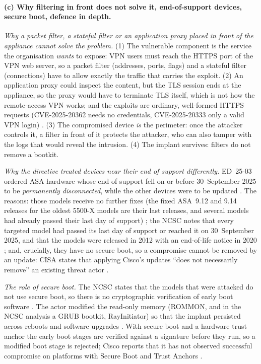 \documentclass[11pt,a4paper]{article}
\begin{document}
\paragraph{(c) Why filtering in front does not solve it, end-of-support devices, secure boot, defence in depth.}
\emph{Why a packet filter, a stateful filter or an application proxy placed in front of the appliance cannot solve the problem.}
(1) The vulnerable component is the service the organisation \emph{wants} to expose: VPN users must reach the HTTPS port of the VPN web server, so a packet filter
(addresses, ports, flags) and a stateful filter (connections) have to allow exactly the traffic that carries the exploit. (2) An application proxy could inspect the
content, but the TLS session ends at the appliance, so the proxy would have to terminate TLS itself, which is not how the remote-access VPN works; and the exploits are
ordinary, well-formed HTTPS requests (CVE-2025-20362 needs no credentials, CVE-2025-20333 only a valid VPN login) \cite{ciscoadv}. (3) The compromised device \emph{is} the perimeter:
once the attacker controls it, a filter in front of it protects the attacker, who can also tamper with the logs that would reveal the intrusion. (4) The implant survives:
filters do not remove a bootkit.

\emph{Why the directive treated devices near their end of support differently.} ED~25-03 ordered ASA hardware whose end of support fell on or before 30~September 2025 to be
\emph{permanently disconnected}, while the other devices were to be updated \cite{ed2503}. The reasons: those models receive no further fixes (the fixed ASA~9.12 and 9.14 releases for the oldest
5500-X models are their last releases, and several models had already passed their last day of support) \cite{ciscoadv,ciscoevent}; the NCSC notes that every targeted model had passed
its last day of support or reached it on 30~September 2025, and that the models were released in 2012 with an end-of-life notice in 2020 \cite{ncscmar}; and, crucially, they have no secure boot, so
a compromise cannot be removed by an update: CISA states that applying Cisco's updates ``does not necessarily remove'' an existing threat actor \cite{ed2503}.

\emph{The role of secure boot.} The NCSC states that the models that were attacked do not use secure boot, so there is no cryptographic verification of early boot software \cite{ncscmar}. The
actor modified the read-only memory (ROMMON, and in the NCSC analysis a GRUB bootkit, RayInitiator) so that the implant persisted across reboots and software upgrades \cite{ciscoevent,ncscmar}. With secure
boot and a hardware trust anchor the early boot stages are verified against a signature before they run, so a modified boot stage is rejected; Cisco reports that it has
not observed successful compromise on platforms with Secure Boot and Trust Anchors \cite{ciscoevent}.
\end{document}
